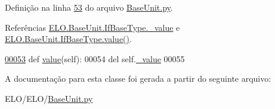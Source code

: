 Definição na linha \hyperlink{BaseUnit_8py_source_l00053}{53} do arquivo \hyperlink{BaseUnit_8py_source}{Base\+Unit.\+py}.



Referências \hyperlink{BaseUnit_8py_source_l00048}{E\+L\+O.\+Base\+Unit.\+If\+Base\+Type.\+\_\+value} e \hyperlink{classELO_1_1BaseUnit_1_1IfBaseType_a2534c3548a8e5991dde0a64b4f0b542b}{E\+L\+O.\+Base\+Unit.\+If\+Base\+Type.\+value()}.


\begin{DoxyCode}
\hypertarget{classELO_1_1BaseUnit_1_1IfBaseType_l00053}{}\hyperlink{classELO_1_1BaseUnit_1_1IfBaseType_a2534c3548a8e5991dde0a64b4f0b542b}{00053}     \textcolor{keyword}{def }\hyperlink{classELO_1_1BaseUnit_1_1IfBaseType_a2534c3548a8e5991dde0a64b4f0b542b}{value}(self):
00054         del self.\hyperlink{classELO_1_1BaseUnit_1_1IfBaseType_ad05d9d377fc4b99743c022cc8f6019d7}{\_value}
00055 
\end{DoxyCode}


A documentação para esta classe foi gerada a partir do seguinte arquivo\+:\begin{DoxyCompactItemize}
\item 
E\+L\+O/\+E\+L\+O/\hyperlink{BaseUnit_8py}{Base\+Unit.\+py}\end{DoxyCompactItemize}
